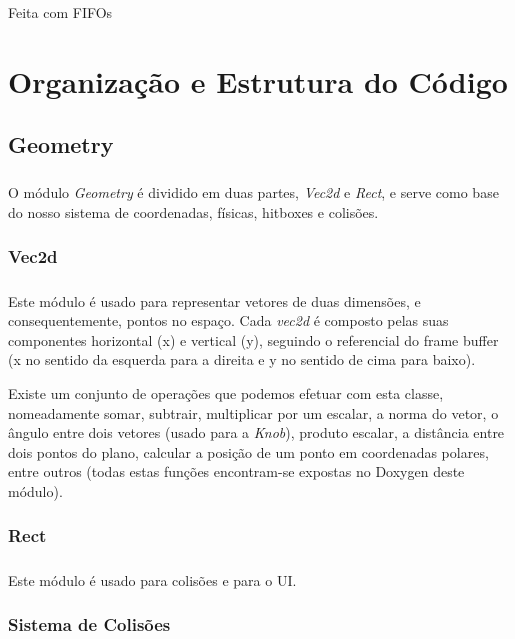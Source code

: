 \documentclass{report}
\begin{document}
Feita com FIFOs

\chapter{Organização e Estrutura do Código}

\section{Geometry}

\paragraph{}
O módulo \textit{Geometry} é dividido em duas partes, \textit{Vec2d} e \textit{Rect}, e serve como base do nosso sistema de coordenadas, físicas, hitboxes e colisões.

\subsection{Vec2d}

\paragraph{}
Este módulo é usado para representar vetores de duas dimensões, e consequentemente, pontos no espaço. Cada \textit{vec2d} é composto pelas suas componentes horizontal (x) e vertical (y), seguindo o referencial do frame buffer (x no sentido da esquerda para a direita e y no sentido de cima para baixo).

Existe um conjunto de operações que podemos efetuar com esta classe, nomeadamente somar, subtrair, multiplicar por um escalar, a norma do vetor, o ângulo entre dois vetores (usado para a \textit{Knob}), produto escalar, a distância entre dois pontos do plano, calcular a posição de um ponto em coordenadas polares, entre outros (todas estas funções encontram-se expostas no Doxygen deste módulo).

\subsection{Rect}

\paragraph{}
Este módulo é usado para colisões e para o UI. 

\subsection{Sistema de Colisões}
\end{document}

